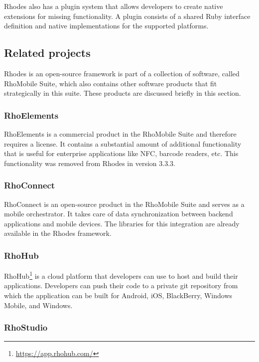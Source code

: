 Rhodes also has a plugin system that allows developers to create native extensions for missing functionality. A plugin consists of a shared Ruby interface definition and native implementations for the supported platforms.

\subsection{Related projects}

Rhodes is an open-source framework is part of a collection of software, called RhoMobile Suite, which also contains other software products that fit strategically in this suite. These products are discussed briefly in this section.

\subsubsection{RhoElements}

RhoElements is a commercial product in the RhoMobile Suite and therefore requires a license. It contains a substantial amount of additional functionality that is useful for enterprise applications like NFC, barcode readers, etc. This functionality was removed from Rhodes in version 3.3.3.

\subsubsection{RhoConnect}

RhoConnect is an open-source product in the RhoMobile Suite and serves as a mobile orchestrator. It takes care of data synchronization between backend applications and mobile devices. The libraries for this integration are already available in the Rhodes framework.

\subsubsection{RhoHub}

RhoHub\footnote{\url{https://app.rhohub.com/}} is a cloud platform that developers can use to host and build their applications. Developers can push their code to a private git repository from which the application can be built for Android, iOS, BlackBerry, Windows Mobile, and Windows.

\subsubsection{RhoStudio}

